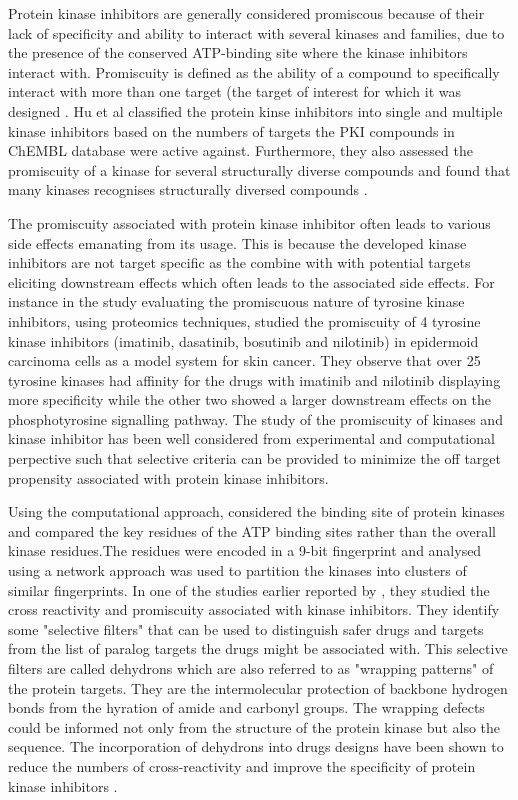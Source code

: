\documentclass[a4paper, 11pt]{article}
\begin{document}
Protein kinase inhibitors are generally considered promiscous because of their lack of specificity and ability to interact with several kinases and families, due to the presence of the conserved ATP-binding site where the kinase inhibitors interact with. Promiscuity is defined as the ability of a compound to specifically interact with more than one target (the target of interest for which it was designed \cite{hu2017mapping}. Hu et al classified the protein kinse inhibitors into single and multiple kinase inhibitors based on the numbers of targets the PKI compounds in ChEMBL database were active against. Furthermore, they also assessed the promiscuity of a kinase for several structurally diverse compounds and found that many kinases recognises structurally diversed compounds \cite{hu2017mapping}.\par
The promiscuity associated with protein kinase inhibitor often leads to various side effects emanating from its usage. This is because the developed kinase inhibitors are not target specific as the combine with  with potential targets eliciting downstream effects which often leads to the associated side effects. For instance in the study evaluating the promiscuous nature of tyrosine kinase inhibitors, \cite{giansanti2014evaluating} using proteomics techniques, studied the promiscuity of 4 tyrosine kinase inhibitors (imatinib, dasatinib, bosutinib and nilotinib) in epidermoid carcinoma cells as a model system for skin cancer. They observe that over 25 tyrosine kinases had affinity for the drugs with imatinib and nilotinib displaying more specificity while the other two showed a larger downstream effects on the phosphotyrosine signalling pathway. The study  of the promiscuity of kinases and kinase inhibitor has been well considered from experimental and computational perpective such that selective criteria can be provided to minimize the off target propensity associated with protein kinase inhibitors.\par
Using the computational approach, \cite{huang2009kinase} considered the binding site of protein kinases and compared the key residues of the ATP binding sites rather than the overall kinase residues.The residues were encoded in a 9-bit fingerprint and analysed using a network approach was used to partition the kinases into clusters of similar fingerprints. In one of the studies earlier reported by \cite{zhang2008turning}, they studied the cross reactivity and promiscuity associated with kinase inhibitors. They identify some "selective filters" that can be used to distinguish safer drugs and targets from the list of paralog targets the drugs might be associated with. This selective filters are called dehydrons which are also referred to as "wrapping patterns" of the protein targets. They are the intermolecular protection of backbone hydrogen bonds from the hyration of amide and carbonyl groups. The wrapping defects could be informed not only from the structure of the protein kinase but also the sequence. The incorporation of dehydrons into drugs designs have been shown to reduce the numbers of cross-reactivity and improve the specificity of protein kinase inhibitors \cite{zhang2008turning}.\par
\end{document}
